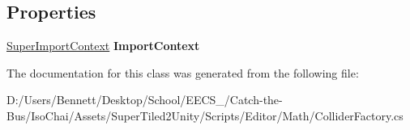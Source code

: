 \subsection*{Properties}
\begin{DoxyCompactItemize}
\item 
\mbox{\label{class_super_tiled2_unity_1_1_editor_1_1_collider_factory_aeeaf09d757dda97d7879a2aca3e8e0b5}} 
\mbox{\hyperlink{class_super_tiled2_unity_1_1_editor_1_1_super_import_context}{Super\+Import\+Context}} {\bfseries Import\+Context}
\end{DoxyCompactItemize}


The documentation for this class was generated from the following file\+:\begin{DoxyCompactItemize}
\item 
D\+:/\+Users/\+Bennett/\+Desktop/\+School/\+E\+E\+C\+S\+\_/\+Catch-\/the-\/\+Bus/\+Iso\+Chai/\+Assets/\+Super\+Tiled2\+Unity/\+Scripts/\+Editor/\+Math/Collider\+Factory.\+cs\end{DoxyCompactItemize}
